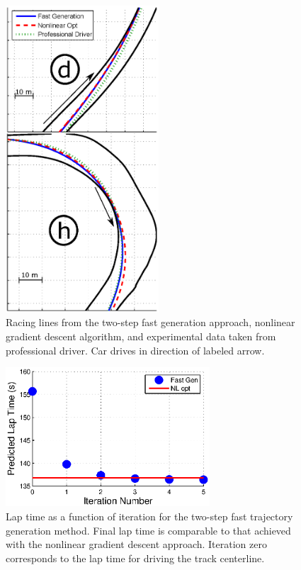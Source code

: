 \documentclass[twocolumn,10pt]{asme2ej}
\begin{document}
\begin{figure}
\centering
\includegraphics[width=2.25in]{figures/composite2.eps}
\caption{Racing lines from the two-step fast generation approach, nonlinear gradient descent algorithm, and experimental data taken
from professional driver. Car drives in direction of labeled arrow.}
\label{compositeFig2}
\end{figure}	

\begin{figure}
\centering
\includegraphics[width=3in]{figures/laptimes.eps}
\caption{Lap time as a function of iteration for the two-step fast trajectory generation method. Final lap time is comparable
to that achieved with the nonlinear gradient descent approach. Iteration zero corresponds to the lap time for driving the track centerline.}
\label{lapTimes}
\end{figure}
\end{document}
